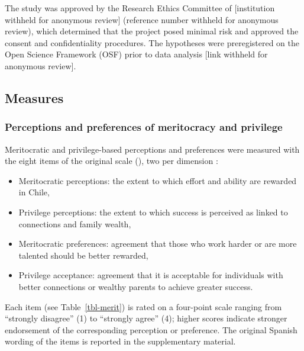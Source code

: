 \documentclass[
  11pt,
]{article}
\begin{document}
The study was approved by the Research Ethics Committee of
{[}institution withheld for anonymous review{]} (reference number
withheld for anonymous review), which determined that the project posed
minimal risk and approved the consent and confidentiality procedures.
The hypotheses were preregistered on the Open Science Framework (OSF)
prior to data analysis {[}link withheld for anonymous review{]}.

\subsection{Measures}\label{measures}

\subsubsection{Perceptions and preferences of meritocracy and
privilege}\label{perceptions-and-preferences-of-meritocracy-and-privilege}

Meritocratic and privilege-based perceptions and preferences were
measured with the eight items of the original scale
(),
two per dimension :

\begin{itemize}
\item
  Meritocratic perceptions: the extent to which effort and ability are
  rewarded in Chile,
\item
  Privilege perceptions: the extent to which success is perceived as
  linked to connections and family wealth,
\item
  Meritocratic preferences: agreement that those who work harder or are
  more talented should be better rewarded,
\item
  Privilege acceptance: agreement that it is acceptable for individuals
  with better connections or wealthy parents to achieve greater success.
\end{itemize}

Each item (see Table~\ref{tbl-merit}) is rated on a four-point scale
ranging from ``strongly disagree'' (1) to ``strongly agree'' (4); higher
scores indicate stronger endorsement of the corresponding perception or
preference. The original Spanish wording of the items is reported in the
supplementary material.
\end{document}
